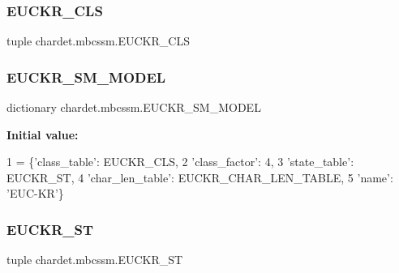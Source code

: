 \subsubsection{\texorpdfstring{E\+U\+C\+K\+R\+\_\+\+C\+LS}{EUCKR\_CLS}}
{\footnotesize\ttfamily tuple chardet.\+mbcssm.\+E\+U\+C\+K\+R\+\_\+\+C\+LS}

\mbox{\label{namespacechardet_1_1mbcssm_ac274a327a95d575959a41247cdb2c2c8}} 
\subsubsection{\texorpdfstring{E\+U\+C\+K\+R\+\_\+\+S\+M\+\_\+\+M\+O\+D\+EL}{EUCKR\_SM\_MODEL}}
{\footnotesize\ttfamily dictionary chardet.\+mbcssm.\+E\+U\+C\+K\+R\+\_\+\+S\+M\+\_\+\+M\+O\+D\+EL}

{\bfseries Initial value\+:}
\begin{DoxyCode}
1 =  \{\textcolor{stringliteral}{'class\_table'}: EUCKR\_CLS,
2                 \textcolor{stringliteral}{'class\_factor'}: 4,
3                 \textcolor{stringliteral}{'state\_table'}: EUCKR\_ST,
4                 \textcolor{stringliteral}{'char\_len\_table'}: EUCKR\_CHAR\_LEN\_TABLE,
5                 \textcolor{stringliteral}{'name'}: \textcolor{stringliteral}{'EUC-KR'}\}
\end{DoxyCode}
\mbox{\label{namespacechardet_1_1mbcssm_a5766b728faa4048afd32f6146cbbe7fe}} 
\subsubsection{\texorpdfstring{E\+U\+C\+K\+R\+\_\+\+ST}{EUCKR\_ST}}
{\footnotesize\ttfamily tuple chardet.\+mbcssm.\+E\+U\+C\+K\+R\+\_\+\+ST}

